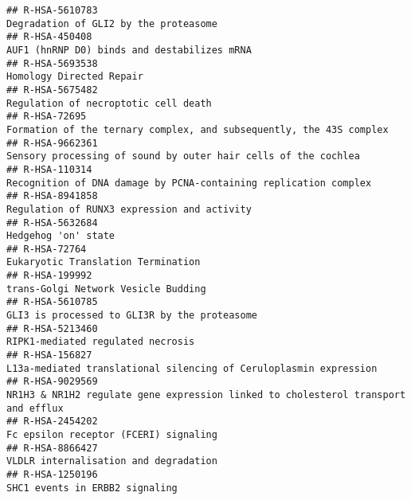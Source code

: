 \documentclass[
]{article}
\begin{document}
\begin{verbatim}
## R-HSA-5610783                                                                                                Degradation of GLI2 by the proteasome
## R-HSA-450408                                                                                           AUF1 (hnRNP D0) binds and destabilizes mRNA
## R-HSA-5693538                                                                                                             Homology Directed Repair
## R-HSA-5675482                                                                                                 Regulation of necroptotic cell death
## R-HSA-72695                                                                    Formation of the ternary complex, and subsequently, the 43S complex
## R-HSA-9662361                                                                       Sensory processing of sound by outer hair cells of the cochlea
## R-HSA-110314                                                                      Recognition of DNA damage by PCNA-containing replication complex
## R-HSA-8941858                                                                                          Regulation of RUNX3 expression and activity
## R-HSA-5632684                                                                                                                  Hedgehog 'on' state
## R-HSA-72764                                                                                                     Eukaryotic Translation Termination
## R-HSA-199992                                                                                                   trans-Golgi Network Vesicle Budding
## R-HSA-5610785                                                                                         GLI3 is processed to GLI3R by the proteasome
## R-HSA-5213460                                                                                                    RIPK1-mediated regulated necrosis
## R-HSA-156827                                                                     L13a-mediated translational silencing of Ceruloplasmin expression
## R-HSA-9029569                                                    NR1H3 & NR1H2 regulate gene expression linked to cholesterol transport and efflux
## R-HSA-2454202                                                                                                Fc epsilon receptor (FCERI) signaling
## R-HSA-8866427                                                                                                VLDLR internalisation and degradation
## R-HSA-1250196                                                                                                       SHC1 events in ERBB2 signaling

\end{verbatim}
\end{document}
